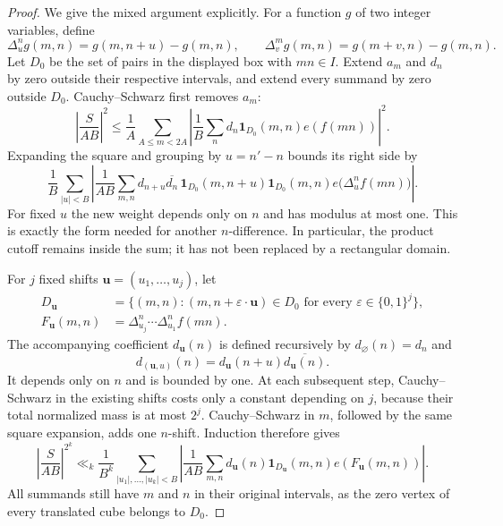 \begin{proof}
We give the mixed argument explicitly.  For a function $g$ of two
integer variables, define
\[
 \Delta^n_u g(m,n)=g(m,n+u)-g(m,n),\qquad
 \Delta^m_v g(m,n)=g(m+v,n)-g(m,n).
\]
Let $D_0$ be the set of pairs in the displayed box with $mn\in I$.
Extend $a_m$ and $d_n$ by zero outside their respective intervals,
and extend every summand by zero outside $D_0$.  Cauchy--Schwarz first
removes $a_m$:
\[
 \left|\frac{S}{AB}\right|^2
 \le\frac1A\sum_{A\le m<2A}
       \left|\frac1B\sum_n d_n\mathbf 1_{D_0}(m,n)e(f(mn))\right|^2.
\]
Expanding the square and grouping by $u=n'-n$ bounds its right side by
\[
 \frac1B\sum_{|u|<B}
 \left|\frac1{AB}\sum_{m,n}
    d_{n+u}\overline{d_n}\,
    \mathbf 1_{D_0}(m,n+u)\mathbf 1_{D_0}(m,n)
    e\bigl(\Delta^n_u f(mn)\bigr)\right|.
\]
For fixed $u$ the new weight depends only on $n$ and has modulus at
most one.  This is exactly the form needed for another $n$-difference.
In particular, the product cutoff remains inside the sum; it has not
been replaced by a rectangular domain.

For $j$ fixed shifts $\mathbf u=(u_1,\ldots,u_j)$, let
\[
 \begin{split}
 D_{\mathbf u}&=\{(m,n):
      (m,n+\varepsilon\cdot\mathbf u)\in D_0
                   \text{ for every }\varepsilon\in\{0,1\}^j\},\\
 F_{\mathbf u}(m,n)&=
    \Delta^n_{u_j}\cdots\Delta^n_{u_1}f(mn).
 \end{split}
\]
The accompanying coefficient $d_{\mathbf u}(n)$ is defined recursively
by $d_\varnothing(n)=d_n$ and
\[
 d_{(\mathbf u,u)}(n)
   =d_{\mathbf u}(n+u)\overline{d_{\mathbf u}(n)}.
\]
It depends only on $n$ and is bounded by one.  At each subsequent step,
Cauchy--Schwarz in the existing shifts costs only a constant depending
on $j$, because their total normalized mass is at most $2^j$.
Cauchy--Schwarz in $m$, followed by the same square expansion, adds one
$n$-shift.  Induction therefore gives
\begin{equation}\label{eq:n-difference-stage}
 \left|\frac{S}{AB}\right|^{2^k}
 \ll_k\frac1{B^k}\sum_{|u_1|,\ldots,|u_k|<B}
 \left|\frac1{AB}\sum_{m,n}
       d_{\mathbf u}(n)\mathbf 1_{D_{\mathbf u}}(m,n)
       e(F_{\mathbf u}(m,n))\right|.
\end{equation}
All summands still have $m$ and $n$ in their original intervals, as the
zero vertex of every translated cube belongs to $D_0$.


\end{proof}
